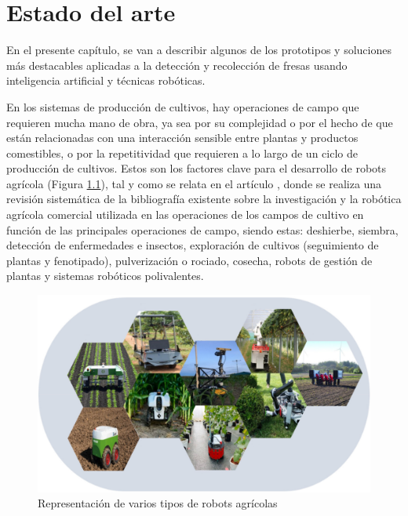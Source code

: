 \chapter{Estado del arte}
\label{cap:capitulo2}

\setcounter{footnote}{7} 
	
En el presente capítulo, se van a describir algunos de los prototipos y soluciones más destacables aplicadas a la detección y recolección de fresas usando inteligencia artificial y técnicas robóticas.

En los sistemas de producción de cultivos, hay operaciones de campo que requieren mucha mano de obra, ya sea por su complejidad o por el hecho de que están relacionadas con una interacción sensible entre plantas y productos comestibles, o por la repetitividad que requieren a lo largo de un ciclo de producción de cultivos. Estos son los factores clave para el desarrollo de robots agrícola (Figura \ref{fig:Robots_agricolas}), tal y como se relata en el artículo \cite{Fountas20}, donde se realiza una revisión sistemática de la bibliografía existente sobre la investigación y la robótica agrícola comercial utilizada en las operaciones de los campos de cultivo en función de las principales operaciones de campo, siendo estas: deshierbe, siembra, detección de enfermedades e insectos, exploración de cultivos (seguimiento de plantas y fenotipado), pulverización o rociado, cosecha, robots de gestión de plantas y sistemas robóticos polivalentes.

\begin{figure} [H]
    \begin{center}
      \includegraphics[width=12cm]{figs/Representación robots agrícolas.png}
    \end{center}
    \caption{Representación de varios tipos de robots agrícolas}
    \label{fig:Robots_agricolas}
\end{figure}

